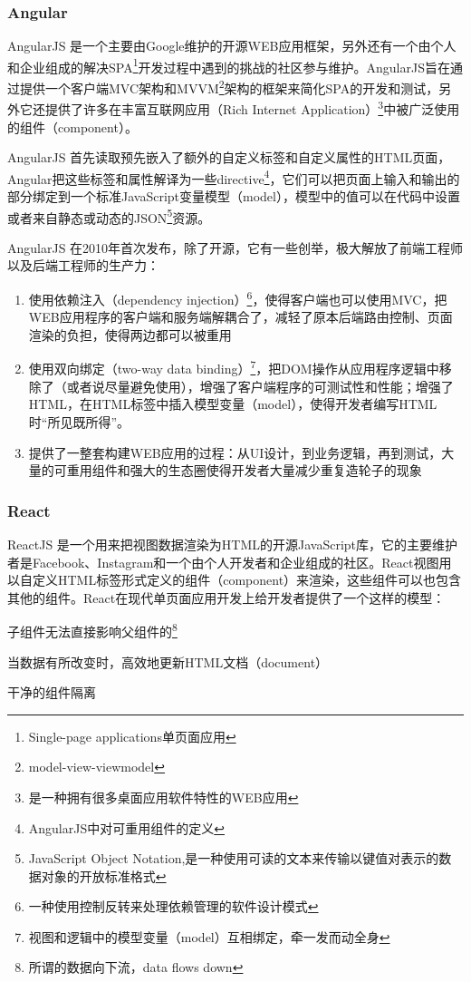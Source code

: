 \subsubsection{Angular}
AngularJS 是一个主要由Google维护的开源WEB应用框架，另外还有一个由个人和企业组成的解决SPA\footnote{Single-page applications单页面应用}开发过程中遇到的挑战的社区参与维护。AngularJS旨在通过提供一个客户端MVC架构和MVVM\footnote{model-view-viewmodel}架构的框架来简化SPA的开发和测试，另外它还提供了许多在丰富互联网应用（Rich Internet Application）\footnote{是一种拥有很多桌面应用软件特性的WEB应用 }中被广泛使用的组件（component）。

AngularJS 首先读取预先嵌入了额外的自定义标签和自定义属性的HTML页面，Angular把这些标签和属性解译为一些directive\footnote{AngularJS中对可重用组件的定义}，它们可以把页面上输入和输出的部分绑定到一个标准JavaScript变量模型（model），模型中的值可以在代码中设置或者来自静态或动态的JSON\footnote{JavaScript Object Notation,是一种使用可读的文本来传输以键值对表示的数据对象的开放标准格式}资源。

AngularJS 在2010年首次发布，除了开源，它有一些创举，极大解放了前端工程师以及后端工程师的生产力：
\begin{enumerate}
  \item 使用依赖注入（dependency injection）\footnote{一种使用控制反转来处理依赖管理的软件设计模式}，使得客户端也可以使用MVC，把WEB应用程序的客户端和服务端解耦合了，减轻了原本后端路由控制、页面渲染的负担，使得两边都可以被重用
  \item 使用双向绑定（two-way data binding）\footnote{视图和逻辑中的模型变量（model）互相绑定，牵一发而动全身}，把DOM操作从应用程序逻辑中移除了（或者说尽量避免使用），增强了客户端程序的可测试性和性能；增强了HTML，在HTML标签中插入模型变量（model），使得开发者编写HTML时“所见既所得”。
  \item 提供了一整套构建WEB应用的过程：从UI设计，到业务逻辑，再到测试，大量的可重用组件和强大的生态圈使得开发者大量减少重复造轮子的现象
\end{enumerate}

\subsubsection{React}
ReactJS 是一个用来把视图数据渲染为HTML的开源JavaScript库，它的主要维护者是Facebook、Instagram和一个由个人开发者和企业组成的社区。React视图用以自定义HTML标签形式定义的组件（component）来渲染，这些组件可以也包含其他的组件。React在现代单页面应用开发上给开发者提供了一个这样的模型：
\begin{enumerate*}
  \item 子组件无法直接影响父组件的\footnote{所谓的数据向下流，data flows down}
  \item 当数据有所改变时，高效地更新HTML文档（document）
  \item 干净的组件隔离
\end{enumerate*}

